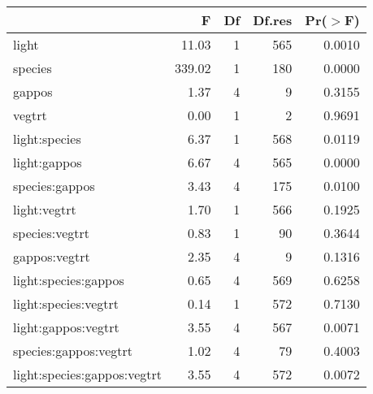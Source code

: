 \begin{tabular}{lrrrr}
  \hline
 & F & Df & Df.res & Pr($>$F) \\ 
  \hline
light & 11.03 & 1 & 565 & 0.0010 \\ 
  species & 339.02 & 1 & 180 & 0.0000 \\ 
  gappos & 1.37 & 4 & 9 & 0.3155 \\ 
  vegtrt & 0.00 & 1 & 2 & 0.9691 \\ 
  light:species & 6.37 & 1 & 568 & 0.0119 \\ 
  light:gappos & 6.67 & 4 & 565 & 0.0000 \\ 
  species:gappos & 3.43 & 4 & 175 & 0.0100 \\ 
  light:vegtrt & 1.70 & 1 & 566 & 0.1925 \\ 
  species:vegtrt & 0.83 & 1 & 90 & 0.3644 \\ 
  gappos:vegtrt & 2.35 & 4 & 9 & 0.1316 \\ 
  light:species:gappos & 0.65 & 4 & 569 & 0.6258 \\ 
  light:species:vegtrt & 0.14 & 1 & 572 & 0.7130 \\ 
  light:gappos:vegtrt & 3.55 & 4 & 567 & 0.0071 \\ 
  species:gappos:vegtrt & 1.02 & 4 & 79 & 0.4003 \\ 
  light:species:gappos:vegtrt & 3.55 & 4 & 572 & 0.0072 \\ 
   \hline
\end{tabular}
